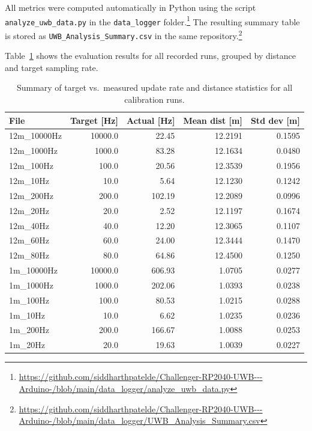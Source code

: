 \documentclass[a4paper,11pt]{article}
\begin{document}
All metrics were computed automatically in Python using the script
\texttt{analyze\_uwb\_data.py} in the \texttt{data\_logger} folder.\footnote{\url{https://github.com/siddharthpatelde/Challenger-RP2040-UWB---Arduino-/blob/main/data_logger/analyze_uwb_data.py}}
The resulting summary table is stored as
\texttt{UWB\_Analysis\_Summary.csv} in the same repository.\footnote{\url{https://github.com/siddharthpatelde/Challenger-RP2040-UWB---Arduino-/blob/main/data_logger/UWB_Analysis_Summary.csv}}

Table~\ref{tab:uwb-summary} shows the evaluation results for all recorded
runs, grouped by distance and target sampling rate.

\begin{table}[h]
	\centering
	\scriptsize
	\caption{Summary of target vs.\ measured update rate and distance statistics
		for all calibration runs.}
	\label{tab:uwb-summary}
	\begin{tabular}{lrrrr}
		\toprule
		\textbf{File} &
		\textbf{Target [Hz]} &
		\textbf{Actual [Hz]} &
		\textbf{Mean dist [m]} &
		\textbf{Std dev [m]} \\
		\midrule
		12m\_10000Hz & 10000.0 & 22.45  & 12.2191 & 0.1595 \\
		12m\_1000Hz  & 1000.0  & 83.28  & 12.1634 & 0.0480 \\
		12m\_100Hz   & 100.0   & 20.56  & 12.3539 & 0.1956 \\
		12m\_10Hz    & 10.0    & 5.64   & 12.1230 & 0.1242 \\
		12m\_200Hz   & 200.0   & 102.19 & 12.2089 & 0.0996 \\
		12m\_20Hz    & 20.0    & 2.52   & 12.1197 & 0.1674 \\
		12m\_40Hz    & 40.0    & 12.20  & 12.3065 & 0.1107 \\
		12m\_60Hz    & 60.0    & 24.00  & 12.3444 & 0.1470 \\
		12m\_80Hz    & 80.0    & 64.86  & 12.4500 & 0.1250 \\
		1m\_10000Hz  & 10000.0 & 606.93 & 1.0705  & 0.0277 \\
		1m\_1000Hz   & 1000.0  & 202.06 & 1.0393  & 0.0238 \\
		1m\_100Hz    & 100.0   & 80.53  & 1.0215  & 0.0288 \\
		1m\_10Hz     & 10.0    & 6.62   & 1.0235  & 0.0236 \\
		1m\_200Hz    & 200.0   & 166.67 & 1.0088  & 0.0253 \\
		1m\_20Hz     & 20.0    & 19.63  & 1.0039  & 0.0227 \\

\end{tabular}
\end{table}
\end{document}
